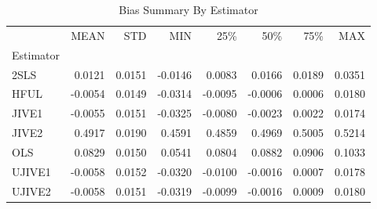 \begin{table}[ht]
\centering
\caption{Bias Summary By Estimator}
\begin{tabular}{lrrrrrrr}
\toprule
 & MEAN & STD & MIN & 25\% & 50\% & 75\% & MAX \\
Estimator &  &  &  &  &  &  &  \\
\midrule
2SLS & 0.0121 & 0.0151 & -0.0146 & 0.0083 & 0.0166 & 0.0189 & 0.0351 \\
HFUL & -0.0054 & 0.0149 & -0.0314 & -0.0095 & -0.0006 & 0.0006 & 0.0180 \\
JIVE1 & -0.0055 & 0.0151 & -0.0325 & -0.0080 & -0.0023 & 0.0022 & 0.0174 \\
JIVE2 & 0.4917 & 0.0190 & 0.4591 & 0.4859 & 0.4969 & 0.5005 & 0.5214 \\
OLS & 0.0829 & 0.0150 & 0.0541 & 0.0804 & 0.0882 & 0.0906 & 0.1033 \\
UJIVE1 & -0.0058 & 0.0152 & -0.0320 & -0.0100 & -0.0016 & 0.0007 & 0.0178 \\
UJIVE2 & -0.0058 & 0.0151 & -0.0319 & -0.0099 & -0.0016 & 0.0009 & 0.0180 \\
\bottomrule
\end{tabular}
\end{table}
